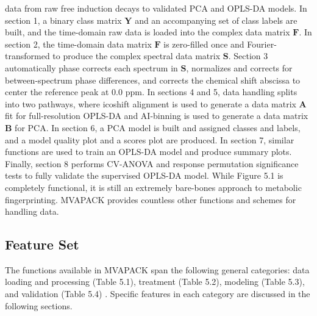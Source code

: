 \begin{doublespace}
data from raw free induction decays to validated PCA and OPLS-DA models. In
section 1, a binary class matrix $\mathbf{Y}$ and an accompanying set of class
labels are built, and the time-domain raw data is loaded into the complex data
matrix $\mathbf{F}$. In section 2, the time-domain data matrix $\mathbf{F}$ is
zero-filled once and Fourier-transformed to produce the complex spectral data
matrix $\mathbf{S}$. Section 3 automatically phase corrects each spectrum in
$\mathbf{S}$, normalizes and corrects for between-spectrum phase differences,
and corrects the chemical shift abscissa to center the reference peak at $0.0$
ppm. In sections 4 and 5, data handling splits into two pathways, where
icoshift alignment \cite{savorani:jmr2010} is used to generate a data matrix
$\mathbf{A}$ fit for full-resolution OPLS-DA and AI-binning
\cite{demeyer:anchem2008} is used to generate a data matrix $\mathbf{B}$ for
PCA. In section 6, a PCA model is built and assigned classes and labels, and
a model quality plot and a scores plot are produced. In section 7, similar
functions are used to train an OPLS-DA model and produce summary plots.
Finally, section 8 performs CV-ANOVA \cite{eriksson:jchemo2008} and response
permutation \cite{westerhuis:metab2008a} significance tests to fully validate
the supervised OPLS-DA model. While Figure 5.1 is completely functional, it is
still an extremely bare-bones approach to metabolic fingerprinting. MVAPACK
provides countless other functions and schemes for handling data.
\end{doublespace}

\subsection{Feature Set}

\begin{doublespace}
The functions available in MVAPACK span the following general categories:
data loading and processing (Table 5.1), treatment (Table 5.2),
modeling (Table 5.3), and validation (Table 5.4) \cite{goodacre:metab2007}.
Specific features in each category are discussed in the following sections.
\end{doublespace}

